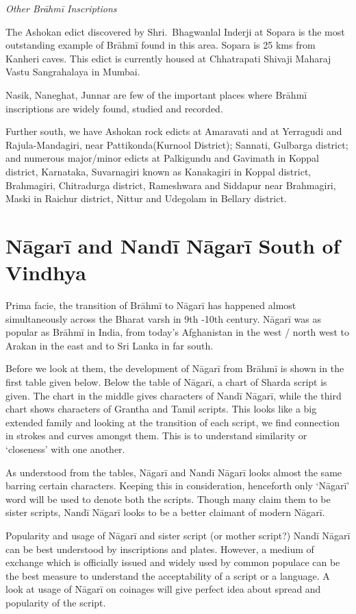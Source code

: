 \textit{Other Brāhmī Inscriptions}

The Ashokan edict discovered by Shri.\ Bhagwanlal Inderji at Sopara is the most outstanding example of Brāhmī found in this area. Sopara is 25 kms from Kanheri caves. This edict is currently housed at Chhatrapati Shivaji Maharaj Vastu Sangrahalaya in Mumbai.

Nasik, Naneghat, Junnar are few of the important places where Brāhmī inscriptions are widely found, studied and recorded.

Further south, we have Ashokan rock edicts at Amaravati and at Yerragudi and Rajula-Mandagiri, near Pattikonda(Kurnool District); Sannati, Gulbarga district; and numerous major/minor edicts at Palkigundu and Gavimath in Koppal district, Karnataka, Suvarnagiri known as Kanakagiri in Koppal district, Brahmagiri, Chitradurga district, Rameshwara and Siddapur near Brahmagiri, Maski in Raichur district, Nittur and Udegolam in Bellary district.


\section*{Nāgarī and Nandī Nāgarī South of Vindhya}

Prima facie, the transition of Brāhmī to Nāgarī has happened almost simultaneously across the Bharat varsh in 9th -10th century. Nāgarī was as popular as Brāhmī in India, from today’s Afghanistan in the west / north west to Arakan in the east and to Sri Lanka in far south.

Before we look at them, the development of Nāgarī from Brāhmī is shown in the first table given below. Below the table of Nāgarī, a chart of Sharda script is given. The chart in the middle gives characters of Nandī Nāgarī, while the third chart shows characters of Grantha and Tamil scripts. This looks like a big extended family and looking at the transition of each script, we find connection in strokes and curves amongst them. This is to understand similarity or ‘closeness’ with one another.

As understood from the tables, Nāgarī and Nandī Nāgarī looks almost the same barring certain characters. Keeping this in consideration, henceforth only ‘Nāgarī’ word will be used to denote both the scripts. Though many claim them to be sister scripts, Nandī Nāgarī looks to be a better claimant of modern Nāgarī.

Popularity and usage of Nāgarī and sister script (or mother script?) Nandī Nāgarī can be best understood by inscriptions and plates. However, a medium of exchange which is officially issued and widely used by common populace can be the best measure to understand the acceptability of a script or a language. A look at usage of Nāgarī on coinages will give perfect idea about spread and popularity of the script.

